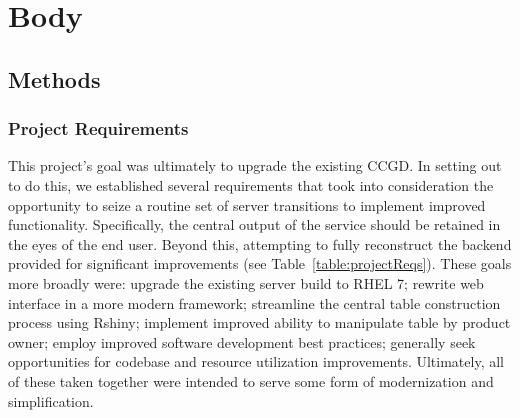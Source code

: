 \documentclass[10pt]{report}
\begin{document}



\chapter{Body}

\section{Methods}

\subsection{Project Requirements}
This project's goal was ultimately to upgrade the existing CCGD\@. In setting out to do this, we established several requirements that took into consideration the opportunity to seize a routine set of server transitions to implement improved functionality. Specifically, the central output of the service should be retained in the eyes of the end user. Beyond this, attempting to fully reconstruct the backend provided for significant improvements (see Table~\ref{table:projectReqs}). These goals more broadly were: upgrade the existing server build to RHEL 7; rewrite web interface in a more modern framework; streamline the central table construction process using Rshiny; implement improved ability to manipulate table by product owner; employ improved software development best practices; generally seek opportunities for codebase and resource utilization improvements. Ultimately, all of these taken together were intended to serve some form of modernization and simplification.
\end{document}
